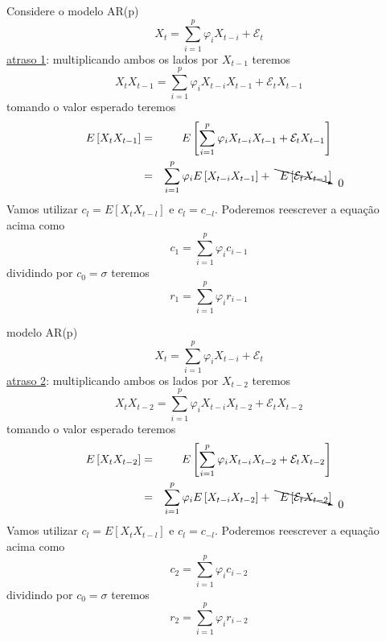 \begin{frame}[allowframebreaks]
  Considere o modelo AR(p)
  \begin{equation}
  X_t = \sum_{i=1}^p \varphi_i X_{t-i} + \mathcal{E}_t
  \end{equation}
  \underline{atraso 1}:
  multiplicando ambos os lados por $X_{t-1}$ teremos
  \begin{equation}
  X_t X_{t-1} = \sum_{i=1}^p \varphi_i X_{t-i} X_{t-1} + \mathcal{E}_t X_{t-1}
  \end{equation}
  tomando o valor esperado teremos
  \begin{eqnarray}
  E\left[ X_t X_{t-1} \right] &=& E\left[ \sum_{i=1}^p \varphi_i X_{t-i} X_{t-1} + \mathcal{E}_t X_{t-1} \right] \nonumber \\
  &=& \sum_{i=1}^p \varphi_i E\left[ X_{t-i} X_{t-1} \right] + \bcancelto{0}{E\left[ \mathcal{E}_t X_{t-1} \right]} 
  \end{eqnarray} 
  Vamos utilizar $c_l = E\left[ X_{t} X_{t-l} \right]$ e $c_l = c_{-l}$. Poderemos reescrever a equação acima como
  \begin{equation}
        c_1 = \sum_{i=1}^p \varphi_i c_{i-1}
  \end{equation}
  dividindo por $c_0 = \sigma$ teremos
  \begin{equation}
        r_1 = \sum_{i=1}^p \varphi_i r_{i-1}
  \end{equation}
  
  
  \framebreak
  modelo AR(p)
  \begin{equation}
  X_t = \sum_{i=1}^p \varphi_i X_{t-i} + \mathcal{E}_t
  \end{equation}
  \underline{atraso 2}:
  multiplicando ambos os lados por $X_{t-2}$ teremos
  \begin{equation}
  X_t X_{t-2} = \sum_{i=1}^p \varphi_i X_{t-i} X_{t-2} + \mathcal{E}_t X_{t-2}
  \end{equation}
  tomando o valor esperado teremos
  \begin{eqnarray}
  E\left[ X_t X_{t-2} \right] &=& E\left[ \sum_{i=1}^p \varphi_i X_{t-i} X_{t-2} + \mathcal{E}_t X_{t-2} \right] \nonumber \\
  &=& \sum_{i=1}^p \varphi_i E\left[ X_{t-i} X_{t-2} \right] + \bcancelto{0}{E\left[ \mathcal{E}_t X_{t-2} \right]} 
  \end{eqnarray} 
  Vamos utilizar $c_l = E\left[ X_{t} X_{t-l} \right]$ e $c_l = c_{-l}$. Poderemos reescrever a equação acima como
  \begin{equation}
        c_2 = \sum_{i=1}^p \varphi_i c_{i-2}
  \end{equation}
  dividindo por $c_0 = \sigma$ teremos
  \begin{equation}
        r_2 = \sum_{i=1}^p \varphi_i r_{i-2}
  \end{equation}
  

\end{frame}

